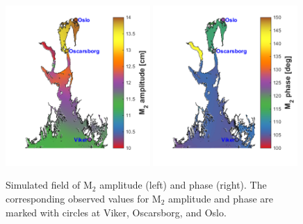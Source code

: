 \begin{figure}[hb] 
\centerline{ 
\includegraphics*[trim=1cm 0cm 0cm 0cm,clip=true,width=0.49\textwidth]{Figurer/M2amp_felt}  
\includegraphics*[trim=0.8cm 0cm 0cm 0cm,clip=true,width=0.49\textwidth]{Figurer/M2fase_felt} 
} 
\caption{\small 
Simulated field of M$_2$ amplitude (left) and phase (right). The corresponding observed values for M$_2$ amplitude and phase are marked with circles at Viker, Oscarsborg, and Oslo.} 
\label{fig:M2field} 
\end{figure} 

